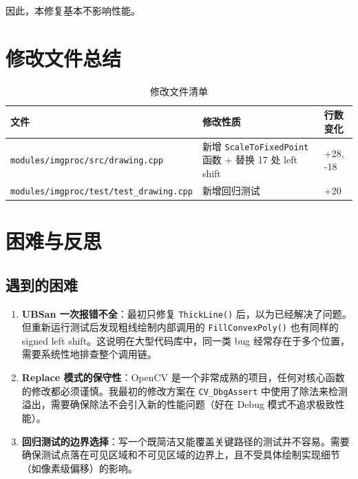 \documentclass[12pt,a4paper]{article}
\begin{document}
因此，本修复基本不影响性能。

\section{修改文件总结}

\begin{table}[h]
\centering
\caption{修改文件清单}
\begin{tabular}{lll}
\toprule
\textbf{文件} & \textbf{修改性质} & \textbf{行数变化} \\
\midrule
\texttt{modules/imgproc/src/drawing.cpp} & 新增 \texttt{ScaleToFixedPoint} 函数 + 替换 17 处 left shift & +28, -18 \\
\texttt{modules/imgproc/test/test\_drawing.cpp} & 新增回归测试 & +20 \\
\bottomrule
\end{tabular}
\end{table}

\section{困难与反思}

\subsection{遇到的困难}

\begin{enumerate}[leftmargin=*]
    \item \textbf{UBSan 一次报错不全}：最初只修复 \texttt{ThickLine()} 后，以为已经解决了问题。但重新运行测试后发现粗线绘制内部调用的 \texttt{FillConvexPoly()} 也有同样的 signed left shift。这说明在大型代码库中，同一类 bug 经常存在于多个位置，需要系统性地排查整个调用链。
    
    \item \textbf{Replace 模式的保守性}：OpenCV 是一个非常成熟的项目，任何对核心函数的修改都必须谨慎。我最初的修改方案在 \texttt{CV\_DbgAssert} 中使用了除法来检测溢出，需要确保除法不会引入新的性能问题（好在 Debug 模式不追求极致性能）。
    
    \item \textbf{回归测试的边界选择}：写一个既简洁又能覆盖关键路径的测试并不容易。需要确保测试点落在可见区域和不可见区域的边界上，且不受具体绘制实现细节（如像素级偏移）的影响。
\end{enumerate}
\end{document}
